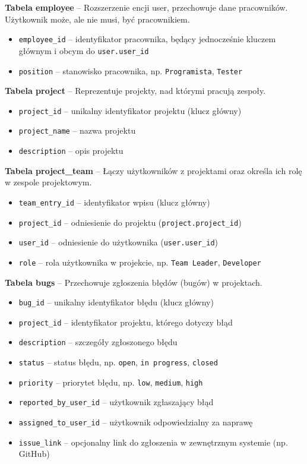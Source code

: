 \documentclass[a4paper,12pt]{article}
\begin{document}
\textbf{Tabela employee} – Rozszerzenie encji user, przechowuje dane pracowników. Użytkownik może, ale nie musi, być pracownikiem.

\begin{itemize}
  \item \texttt{employee\_id} – identyfikator pracownika, będący jednocześnie kluczem głównym i obcym do \texttt{user.user\_id}
  \item \texttt{position} – stanowisko pracownika, np. \texttt{Programista}, \texttt{Tester}
\end{itemize}

\textbf{Tabela project} – Reprezentuje projekty, nad którymi pracują zespoły.

\begin{itemize}
  \item \texttt{project\_id} – unikalny identyfikator projektu (klucz główny)
  \item \texttt{project\_name} – nazwa projektu
  \item \texttt{description} – opis projektu
\end{itemize}

\textbf{Tabela project\_team} – Łączy użytkowników z projektami oraz określa ich rolę w zespole projektowym.

\begin{itemize}
  \item \texttt{team\_entry\_id} – identyfikator wpisu (klucz główny)
  \item \texttt{project\_id} – odniesienie do projektu (\texttt{project.project\_id})
  \item \texttt{user\_id} – odniesienie do użytkownika (\texttt{user.user\_id})
  \item \texttt{role} – rola użytkownika w projekcie, np. \texttt{Team Leader}, \texttt{Developer}
\end{itemize}

\textbf{Tabela bugs} – Przechowuje zgłoszenia błędów (bugów) w projektach.

\begin{itemize}
  \item \texttt{bug\_id} – unikalny identyfikator błędu (klucz główny)
  \item \texttt{project\_id} – identyfikator projektu, którego dotyczy błąd
  \item \texttt{description} – szczegóły zgłoszonego błędu
  \item \texttt{status} – status błędu, np. \texttt{open}, \texttt{in progress}, \texttt{closed}
  \item \texttt{priority} – priorytet błędu, np. \texttt{low}, \texttt{medium}, \texttt{high}
  \item \texttt{reported\_by\_user\_id} – użytkownik zgłaszający błąd
  \item \texttt{assigned\_to\_user\_id} – użytkownik odpowiedzialny za naprawę
  \item \texttt{issue\_link} – opcjonalny link do zgłoszenia w zewnętrznym systemie (np. GitHub)
\end{itemize}
\end{document}
